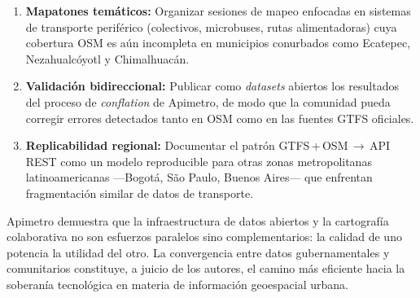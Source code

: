 \begin{enumerate}[nosep, leftmargin=1.5em]
  \item \textbf{Mapatones temáticos:}  Organizar sesiones de mapeo enfocadas en
    sistemas de transporte periférico (colectivos, microbuses, rutas alimentadoras)
    cuya cobertura OSM es aún incompleta en municipios conurbados como Ecatepec,
    Nezahualcóyotl y Chimalhuacán.
  \item \textbf{Validación bidireccional:}  Publicar como \textit{datasets}
    abiertos los resultados del proceso de \textit{conflation} de Apimetro, de
    modo que la comunidad pueda corregir errores detectados tanto en OSM como en
    las fuentes GTFS oficiales.
  \item \textbf{Replicabilidad regional:}  Documentar el patrón
    GTFS\,+\,OSM\,$\to$\,API REST como un modelo reproducible para otras zonas
    metropolitanas latinoamericanas ---Bogotá, São Paulo, Buenos Aires--- que
    enfrentan fragmentación similar de datos de transporte.
\end{enumerate}

Apimetro demuestra que la infraestructura de datos abiertos y la cartografía
colaborativa no son esfuerzos paralelos sino complementarios: la calidad de uno
potencia la utilidad del otro.  La convergencia entre datos gubernamentales y
comunitarios constituye, a juicio de los autores, el camino más eficiente hacia la
soberanía tecnológica en materia de información geoespacial urbana.

